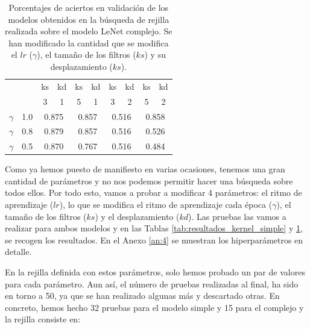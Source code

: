 \documentclass[a4paper,12pt,oneside,titlepage]{book}
\begin{document}
\begin{table}[h!]
  \centering
  \begin{tabular}{|cc||cc|cc|cc|cc|}
  \hline
  \multicolumn{2}{|c||}{\multirow{2}{*}{}} & \multicolumn{1}{c|}{ks} & kd & \multicolumn{1}{c|}{ks} & kd & \multicolumn{1}{c|}{ks} & kd & \multicolumn{1}{c|}{ks} & kd \\ \cline{3-10} 
  \multicolumn{2}{|c||}{}                  & \multicolumn{1}{c|}{3}  & 1  & \multicolumn{1}{c|}{5}  & 1  & \multicolumn{1}{c|}{3}  & 2  & \multicolumn{1}{c|}{5}  & 2  \\ \hline\hline
  \multicolumn{1}{|c|}{$\gamma$}   & 1.0  & \multicolumn{2}{c|}{0.875}   & \multicolumn{2}{c|}{0.857}   & \multicolumn{2}{c|}{0.516}   & \multicolumn{2}{c|}{0.858}   \\ \hline
  \multicolumn{1}{|c|}{$\gamma$}   & 0.8  & \multicolumn{2}{c|}{0.879}   & \multicolumn{2}{c|}{0.857}   & \multicolumn{2}{c|}{0.516}   & \multicolumn{2}{c|}{0.526}   \\ \hline
  \multicolumn{1}{|c|}{$\gamma$}   & 0.5  & \multicolumn{2}{c|}{0.870}   & \multicolumn{2}{c|}{0.767}   & \multicolumn{2}{c|}{0.516}   & \multicolumn{2}{c|}{0.484}   \\ \hline
  \end{tabular}
  \caption{Porcentajes de aciertos en validación de los modelos obtenidos en la búsqueda de rejilla realizada sobre el modelo LeNet complejo. Se han modificado la cantidad que se modifica el $lr$ ($\gamma$), el tamaño de los filtros ($ks$) y su desplazamiento ($ks$).}
  \label{tab:resultados_kernel_complejo}
\end{table}

Como ya hemos puesto de manifiesto en varias ocasiones, tenemos una gran cantidad de parámetros y no nos podemos permitir hacer una búsqueda sobre todos ellos. Por todo esto, vamos a probar a modificar 4 parámetros: el ritmo de aprendizaje ($lr$), lo que se modifica el ritmo de aprendizaje cada época ($\gamma$), el tamaño de los filtros ($ks$) y el desplazamiento ($kd$). Las pruebas las vamos a realizar para ambos modelos y en las Tablas \ref{tab:resultados_kernel_simple} y \ref{tab:resultados_kernel_complejo}, se recogen los resultados. En el Anexo \ref{an:4} se muestran los hiperparámetros en detalle.
 
En la rejilla definida con estos parámetros, solo hemos probado un par de valores para cada parámetro. Aun así, el número de pruebas realizadas al final, ha sido en torno a 50, ya que se han realizado algunas más y descartado otras. En concreto, hemos hecho 32 pruebas para el modelo simple y 15 para el complejo y la rejilla consiste en:
\end{document}
